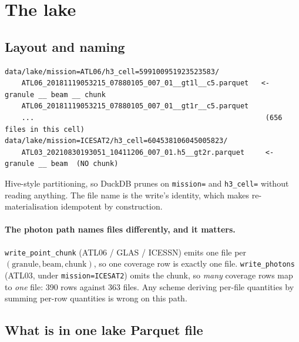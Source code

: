 \documentclass[11pt,a4paper]{article}
\newcommand{\code}[1]{\texttt{\small #1}}
\begin{document}
\section{The lake}

\subsection{Layout and naming}

\begin{center}
\begin{Verbatim}[fontsize=\scriptsize, frame=single, framesep=3mm, rulecolor=\color{soft}]
data/lake/mission=ATL06/h3_cell=599100951923523583/
    ATL06_20181119053215_07880105_007_01__gt1l__c5.parquet   <- granule __ beam __ chunk
    ATL06_20181119053215_07880105_007_01__gt1r__c5.parquet
    ...                                                       (656 files in this cell)
data/lake/mission=ICESAT2/h3_cell=604538106045005823/
    ATL03_20210830193051_10411206_007_01.h5__gt2r.parquet     <- granule __ beam  (NO chunk)
\end{Verbatim}
\end{center}

\noindent
Hive-style partitioning, so DuckDB prunes on \code{mission=} and \code{h3\_cell=} without reading anything.
The file name is the write's identity, which makes re-materialisation idempotent by construction.

\paragraph{The photon path names files differently, and it matters.}
\code{write\_point\_chunk} (ATL06 / GLAS / ICESSN) emits one file per
\((\text{granule},\text{beam},\text{chunk})\), so one coverage row is exactly one file.
\code{write\_photons} (ATL03, under \code{mission=ICESAT2}) omits the chunk, so \emph{many} coverage rows map
to \emph{one} file: 390 rows against 363 files. Any scheme deriving per-file quantities by summing per-row
quantities is wrong on this path.

\subsection{What is in one lake Parquet file}
\end{document}
